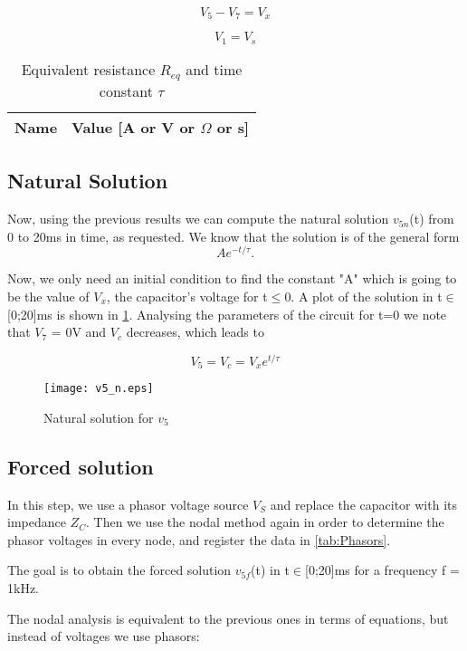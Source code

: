 \begin{equation}
  V_5 - V_7 = V_x
  \label{eq:kvl9}
\end{equation}

\begin{equation}
 V_1 = V_s 
  \label{eq:kvl10}
\end{equation}


\begin{table}[h]
  \centering
  \begin{tabular}{|l|r|}
    \hline    
    {\bf Name} & {\bf Value [A or V or $\Omega$ or s]} \\ \hline
    
  \end{tabular}
  \caption{Equivalent resistance $R_{eq}$ and time constant $\tau$}
  \label{tab:Req}
\end{table}
\FloatBarrier

\subsection{Natural Solution}

Now, using the previous results we can compute the natural solution $v_{5n}$(t) from 0 to 20ms in time, as requested. We know that the solution is of the general form 
\begin{equation}
Ae^{-t/\tau}.
\label{eq:kvl11}
\end{equation}

Now, we only need an initial condition to find the constant "A" which is going to be the value of $V_x$, the capacitor's voltage for t$\leq$0. A plot of the solution in t$\in$[0;20]ms is shown in \ref{fig:v5_n}. Analysing the parameters of the circuit for t=0 we note that $V_7$ = 0V and $V_c$ decreases, which leads to

\begin{equation}
  V_5 = V_c = V_xe^{t/\tau} 
  \label{eq:kvl12}
\end{equation}


\begin{figure}[h] \centering
\texttt{[image: v5\_n.eps]}
\caption{Natural solution for $v_5$}
\label{fig:v5_n}
\end{figure}
\FloatBarrier

\subsection{Forced solution}

In this step, we use a phasor voltage source $V_S$ and replace the capacitor with its impedance $Z_C$. Then we use the nodal method again in order to determine the phasor voltages in every node, and register the data in \ref{tab:Phasors}. \par
The goal is to obtain the forced solution $v_{5f}$(t) in t$\in$[0;20]ms for a frequency f = 1kHz. \par
The nodal analysis is equivalent to the previous ones in terms of equations, but instead of voltages we use phasors:


